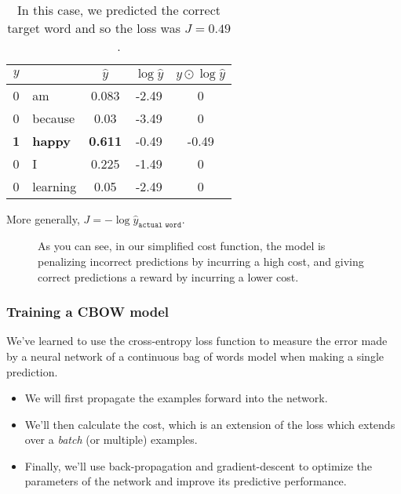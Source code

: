 \documentclass[12pt]{article}
\begin{document}
\begin{table}[h]
  \begin{center}
    \begin{tabular}{c | l c c c}
      $y$ & & $\hat y$ & $\log \hat y$ & $y \odot \log \hat y$ \\
      \hline
      0 & am & 0.083 & -2.49 & 0 \\
      0 & because & 0.03 & -3.49 & 0 \\
      \textbf{1} & \textbf{happy} & \textbf{0.611} & -0.49 & -0.49 \\
      0 & I & 0.225 & -1.49 & 0 \\
      0 & learning & 0.05 & -2.49 & 0
    \end{tabular}
    \caption{In this case, we predicted the correct target word and so the loss was $J = 0.49$.}
  \end{center}
\end{table}

More generally, $J = - \log \hat y_{\texttt{actual word}}$.

\begin{figure}[h]
  \begin{center}
    \caption{As you can see, in our simplified cost function, the model is penalizing incorrect predictions by incurring a high cost, and giving correct predictions a reward by incurring a lower cost.}
  \end{center}
\end{figure}

\subsubsection{Training a CBOW model}
We've learned to use the cross-entropy loss function to measure the error made by a neural network of a continuous bag of words model when making a single prediction.
\begin{itemize}
\item We will first propagate the examples forward into the network.
\item We'll then calculate the cost, which is an extension of the loss which extends over a \emph{batch} (or multiple) examples.
\item Finally, we'll use back-propagation and gradient-descent to optimize the parameters of the network and improve its predictive performance.
\end{itemize}
\end{document}

